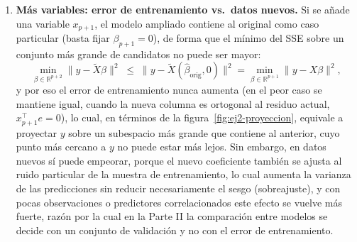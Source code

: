 \begin{enumerate}
\item \textbf{Más variables: error de entrenamiento vs.\ datos nuevos.}
Si se añade una variable $x_{p+1}$, el modelo ampliado contiene al
original como caso particular (basta fijar $\beta_{p+1}=0$), de forma
que el mínimo del SSE sobre un conjunto más grande de candidatos no
puede ser mayor:
\[
    \min_{\beta\in\mathbb{R}^{p+2}} \lVert y-\tilde X\beta\rVert^2
    \;\le\;
    \lVert y-\tilde X(\hat\beta_{\text{orig}},0)\rVert^2
    = \min_{\beta\in\mathbb{R}^{p+1}} \lVert y-X\beta\rVert^2 ,
\]
y por eso el error de entrenamiento nunca aumenta (en el peor caso se
mantiene igual, cuando la nueva columna es ortogonal al residuo actual,
$x_{p+1}^\top e=0$), lo cual, en términos de la
figura~\ref{fig:ej2-proyeccion}, equivale a proyectar $y$ sobre un
subespacio más grande que contiene al anterior, cuyo punto más cercano
a $y$ no puede estar más lejos.
Sin embargo, en datos nuevos sí puede empeorar, porque el nuevo
coeficiente también se ajusta al ruido particular de la muestra de
entrenamiento, lo cual aumenta la varianza de las predicciones sin
reducir necesariamente el sesgo (sobreajuste), y con pocas
observaciones o predictores correlacionados este efecto se vuelve más
fuerte, razón por la cual en la Parte II la comparación entre modelos se
decide con un conjunto de validación y no con el error de
entrenamiento.

\end{enumerate}
